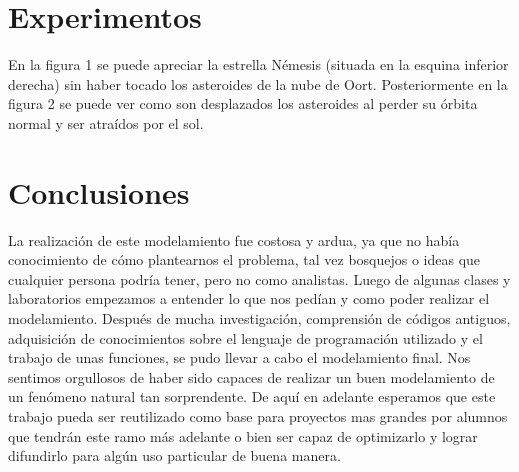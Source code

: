 \documentclass[journal]{IEEEtran}
\begin{document}
\section{Experimentos}

En la figura 1 se puede apreciar la estrella Némesis (situada en la esquina inferior derecha) sin haber tocado los asteroides de la nube de Oort. Posteriormente en la figura 2 se puede ver como son desplazados los asteroides al perder su órbita normal y ser atraídos por el sol.

\section{Conclusiones}

La realización de este modelamiento fue costosa y ardua, ya que no había conocimiento de cómo plantearnos el problema, tal vez bosquejos o ideas que cualquier persona podría tener, pero no como analistas. Luego de algunas clases y laboratorios empezamos a entender lo que nos pedían y como poder realizar el modelamiento. Después de mucha investigación, comprensión de códigos antiguos, adquisición de conocimientos sobre el lenguaje de programación utilizado y el trabajo de unas funciones, se pudo llevar a cabo el modelamiento final. Nos sentimos orgullosos de haber sido capaces de realizar un buen modelamiento de un fenómeno natural tan sorprendente. De aquí en adelante esperamos que este trabajo pueda ser reutilizado como base para proyectos mas grandes por alumnos que tendrán este ramo más adelante o bien ser capaz de optimizarlo y lograr difundirlo para algún uso particular de buena manera.



\end{document}
